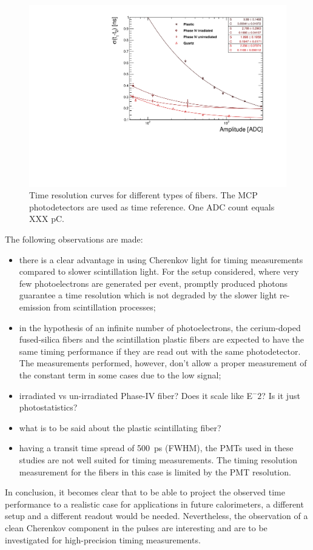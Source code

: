 \documentclass[a4paper,11pt]{article}
\begin{document}
\begin{figure}[ht]
\begin{center}\vspace{-1pc}
      \includegraphics[width=12cm]{Figures/fibres_time_res}
\caption{\small Time resolution curves for different types of fibers. The MCP photodetectors are used as time reference.  One ADC count equals XXX pC.}
    \label{fig:fibres_time_res}
\end{center}
\end{figure}
The following observations are made:
\begin{itemize}
\item there is a clear advantage in using Cherenkov light for timing measurements compared to slower scintillation light. For the setup considered, where very few photoelectrons are generated per event, promptly produced photons guarantee a time resolution which is not degraded by the slower light re-emission from scintillation processes;
\item in the hypothesis of an infinite number of photoelectrons, the cerium-doped fused-silica fibers and the scintillation plastic fibers are expected to have the same timing performance if they are read out with the same photodetector. The measurements performed, however, don't allow a proper measurement of the constant term in some cases due to the low signal;
\item irradiated vs un-irradiated Phase-IV fiber?  Does it scale like E$^-2$?  Is it just photostatistics?
\item what is to be said about the plastic scintillating fiber?
\item having a transit time spread of 500~ps (FWHM), the PMTs used in these studies are not well suited for timing measurements. The timing resolution measurement for the fibers in this case is limited by the PMT resolution.
\end{itemize}
In conclusion, it becomes clear that to be able to project the observed time performance to a realistic case for applications in future calorimeters, a different setup and a different readout would be needed. Nevertheless, the observation of a clean Cherenkov component in the pulses are interesting and are to be investigated for high-precision timing measurements.
\end{document}
